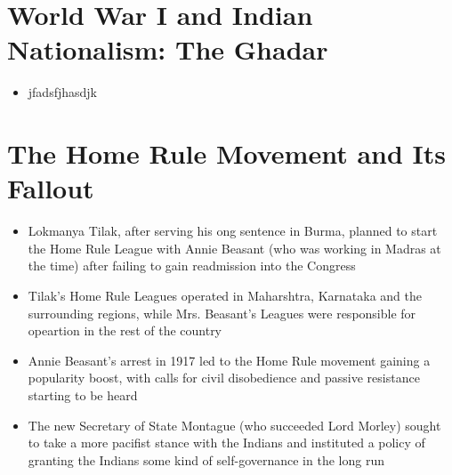 \section{World War I and Indian Nationalism: The Ghadar}
\begin{itemize}
    \item jfadsfjhasdjk
\end{itemize}

\section{The Home Rule Movement and Its Fallout}
\begin{itemize}
    \item Lokmanya Tilak, after serving his ong sentence in Burma, planned to start the Home Rule League with Annie Beasant (who was working in Madras at the time) after failing to gain readmission into the Congress
    \item Tilak's Home Rule Leagues operated in Maharshtra, Karnataka and the surrounding regions, while Mrs. Beasant's Leagues were responsible for opeartion in the rest of the country
    \item Annie Beasant's arrest in 1917 led to the Home Rule movement gaining a popularity boost, with calls for civil disobedience and passive resistance starting to be heard
    \item The new Secretary of State Montague (who succeeded Lord Morley) sought to take a more pacifist stance with the Indians and instituted a policy of granting the Indians some kind of self-governance in the long run
\end{itemize}

